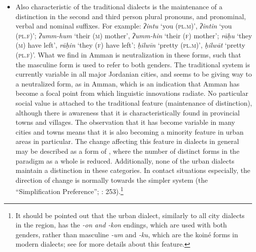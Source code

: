 \documentclass[output=paper]{langsci/langscibook}
\begin{document}
\begin{itemize}
\item[] Also characteristic of the traditional dialects is the maintenance of a  distinction in the second and third person plural pronouns, and pronominal, verbal and nominal suffixes. For example: \textit{ʔintu} ‘you (\textsc{pl.m})’, \textit{ʔintin} ‘you (\textsc{pl.f})’; \textit{ʔumm-hum} ‘their (\textsc{m}) mother’, \textit{ʔumm-hin} ‘their (\textsc{f}) mother’; \textit{rāḥu} ‘they (\textsc{m}) have left’, \textit{rāḥin} ‘they (\textsc{f}) have left’; \textit{ḥilwīn} ‘pretty (\textsc{pl.m})’, \textit{ḥilwāt} ‘pretty (\textsc{pl.f})'. What we find in Amman is  neutralization in these forms, such that the masculine form is used to refer to both genders. The traditional system is currently variable in all major Jordanian cities, and seems to be giving way to a neutralized form, as in Amman, which is an indication that Amman has become a focal point from which linguistic innovations radiate. No particular social value is attached to the traditional feature (maintenance of  distinction), although there is awareness that it is characteristically found in provincial towns and villages. The observation that it has become variable in many cities and towns means that it is also becoming a minority feature in urban areas in particular. The change affecting this feature in  dialects in general may be described as a form of , where the number of distinct forms in the paradigm as a whole is reduced. Additionally, none of the urban  dialects maintain a  distinction in these categories. In contact situations especially, the direction of change is normally towards the simpler system (the “Simplification Preference”; \citealt{Lass1997}: 253).\footnote{It should be pointed out that the urban  dialect, similarly to all city dialects in the region, has the \textit{{}-on and -kon} endings, which are used with both genders, rather than masculine \textit{{}-um} and \textit{{}-ku}, which are the koiné forms in modern  dialects; see \citet{Al-Wer2003kum} for more details about this feature.} 


\end{itemize}
\end{document}
